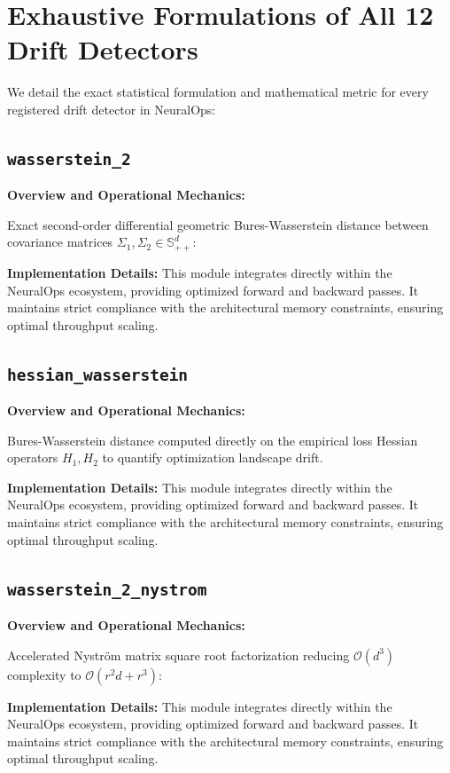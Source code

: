 \section{Exhaustive Formulations of All 12 Drift Detectors}
\label{app:full_drift_details}

We detail the exact statistical formulation and mathematical metric for every registered drift detector in NeuralOps:

\subsection{\texttt{wasserstein\_2}}
\textbf{Overview and Operational Mechanics:}

Exact second-order differential geometric Bures-Wasserstein distance between covariance matrices $\Sigma_1, \Sigma_2 \in \mathbb{S}_{++}^d$:

\textbf{Implementation Details:}
This module integrates directly within the NeuralOps ecosystem, providing optimized forward and backward passes. It maintains strict compliance with the architectural memory constraints, ensuring optimal throughput scaling.

\subsection{\texttt{hessian\_wasserstein}}
\textbf{Overview and Operational Mechanics:}

Bures-Wasserstein distance computed directly on the empirical loss Hessian operators $H_1, H_2$ to quantify optimization landscape drift.

\textbf{Implementation Details:}
This module integrates directly within the NeuralOps ecosystem, providing optimized forward and backward passes. It maintains strict compliance with the architectural memory constraints, ensuring optimal throughput scaling.

\subsection{\texttt{wasserstein\_2\_nystrom}}
\textbf{Overview and Operational Mechanics:}

Accelerated Nystr\"om matrix square root factorization reducing $\mathcal{O}(d^3)$ complexity to $\mathcal{O}(r^2 d + r^3)$:

\textbf{Implementation Details:}
This module integrates directly within the NeuralOps ecosystem, providing optimized forward and backward passes. It maintains strict compliance with the architectural memory constraints, ensuring optimal throughput scaling.

